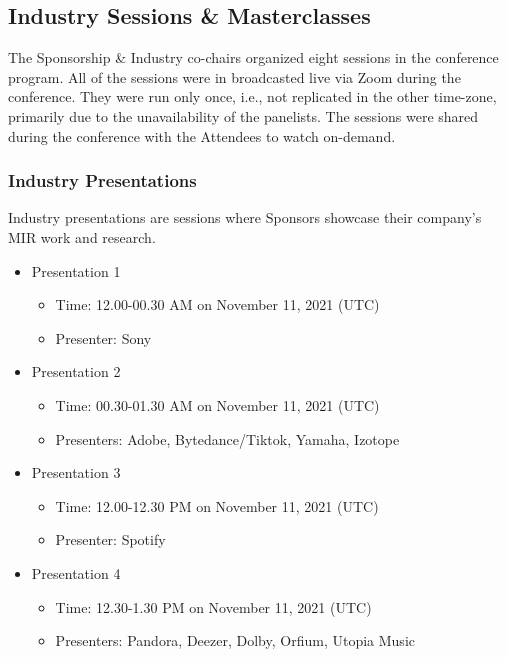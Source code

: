 \documentclass[%
10pt,								%
]
{scrartcl}
\begin{document}
    \subsection{Industry Sessions \& Masterclasses}\label{sec:industrysessions}
        The Sponsorship \& Industry co-chairs organized eight sessions in the conference program. All of the sessions were in broadcasted live via Zoom during the conference. They were run only once, i.e., not replicated in the other time-zone, primarily due to the unavailability of the panelists. The sessions were shared during the conference with the Attendees to watch on-demand.
        
        \subsubsection{Industry Presentations}
            Industry presentations are sessions where Sponsors showcase their company's MIR work and research.
            \begin{itemize}
                \item Presentation 1
                    \begin{itemize}
                        \item Time: 12.00-00.30 AM on November 11, 2021 (UTC)
                        \item   Presenter: Sony
                    \end{itemize}
                \item Presentation 2
                    \begin{itemize}
                        \item Time: 00.30-01.30 AM on November 11, 2021 (UTC)
                        \item   Presenters: Adobe, Bytedance/Tiktok, Yamaha, Izotope
                    \end{itemize}
                \item Presentation 3
                    \begin{itemize}
                        \item Time: 12.00-12.30 PM on November 11, 2021 (UTC)
                        \item   Presenter: Spotify
                    \end{itemize}
                \item Presentation 4
                    \begin{itemize}
                        \item Time: 12.30-1.30 PM on November 11, 2021 (UTC)
                        \item  Presenters: Pandora, Deezer, Dolby, Orfium, Utopia Music 
                    \end{itemize}
            \end{itemize}
\end{document}
